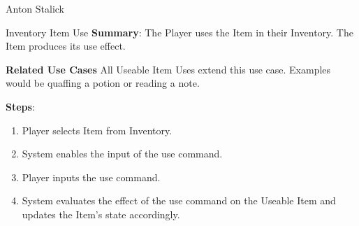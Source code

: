 \documentclass[12pt]{report}
\begin{document}
\begin{section}{Anton Stalick}
\begin{subsection}{Inventory Item Use}
\textbf{Summary}:
The Player uses the Item in their Inventory. The Item produces its
use effect.

\textbf{Related Use Cases}
All Useable Item Uses extend this use case. Examples would be quaffing
a potion or reading a note.

\textbf{Steps}:
\begin{enumerate}
\item Player selects Item from Inventory.
\item System enables the input of the use command.
\item Player inputs the use command.
\item System evaluates the effect of the use command on the
Useable Item and updates the Item's state accordingly.
\end{enumerate}

\end{subsection}
\end{section}
\end{document}
